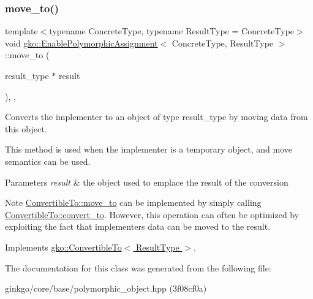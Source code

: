 \subsubsection{\texorpdfstring{move\+\_\+to()}{move\_to()}}
{\footnotesize\ttfamily template$<$typename Concrete\+Type, typename Result\+Type = Concrete\+Type$>$ \\
void \hyperlink{classgko_1_1EnablePolymorphicAssignment}{gko\+::\+Enable\+Polymorphic\+Assignment}$<$ Concrete\+Type, Result\+Type $>$\+::move\+\_\+to (\begin{DoxyParamCaption}\item[{result\+\_\+type $\ast$}]{result }\end{DoxyParamCaption})\hspace{0.3cm}{\ttfamily [inline]}, {\ttfamily [override]}, {\ttfamily [virtual]}}



Converts the implementer to an object of type result\+\_\+type by moving data from this object. 

This method is used when the implementer is a temporary object, and move semantics can be used.


\begin{DoxyParams}{Parameters}
{\em result} & the object used to emplace the result of the conversion\\
\hline
\end{DoxyParams}
\begin{DoxyNote}{Note}
\hyperlink{classgko_1_1ConvertibleTo_ab9047c7c49e0f83c79b54c0034d6197b}{Convertible\+To\+::move\+\_\+to} can be implemented by simply calling \hyperlink{classgko_1_1ConvertibleTo_aa7f3420babcbed39ee15bc020bed4f7e}{Convertible\+To\+::convert\+\_\+to}. However, this operation can often be optimized by exploiting the fact that implementer\textquotesingle{}s data can be moved to the result. 
\end{DoxyNote}


Implements \hyperlink{classgko_1_1ConvertibleTo_ab9047c7c49e0f83c79b54c0034d6197b}{gko\+::\+Convertible\+To$<$ Result\+Type $>$}.



The documentation for this class was generated from the following file\+:\begin{DoxyCompactItemize}
\item 
ginkgo/core/base/polymorphic\+\_\+object.\+hpp (3f08cf0a)\end{DoxyCompactItemize}
